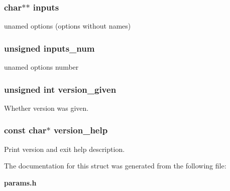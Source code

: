 \subsubsection[{inputs}]{\setlength{\rightskip}{0pt plus 5cm}char$\ast$$\ast$ {\bf inputs}}\label{da/dad/structgengetopt__args__info_af3ddc6025fe86732ac15e4e99668b2c2}


unamed options (options without names) 

\subsubsection[{inputs\_\-num}]{\setlength{\rightskip}{0pt plus 5cm}unsigned {\bf inputs\_\-num}}\label{da/dad/structgengetopt__args__info_a82877ad61d11ce414231e005f83c8813}


unamed options number 

\subsubsection[{version\_\-given}]{\setlength{\rightskip}{0pt plus 5cm}unsigned int {\bf version\_\-given}}\label{da/dad/structgengetopt__args__info_afcc1edf402beec6813e6eb77e78c4e69}


Whether version was given. 

\subsubsection[{version\_\-help}]{\setlength{\rightskip}{0pt plus 5cm}const char$\ast$ {\bf version\_\-help}}\label{da/dad/structgengetopt__args__info_a7e23c8aafc418235e902b68700cca59e}


Print version and exit help description. 



The documentation for this struct was generated from the following file:\begin{DoxyCompactItemize}
\item 
{\bf params.h}\end{DoxyCompactItemize}
